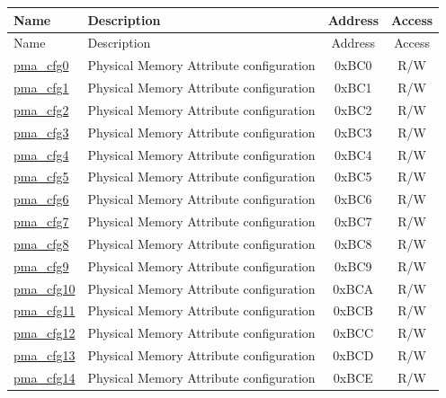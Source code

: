 \begin{longtable}{ | p{4.0cm} | p{8.4cm} | c | c| }
\hline\rowcolor{lightgray}
Name & Description & Address & Access \\ \hline
\endfirsthead
\hline
\rowcolor{lightgray}
Name & Description & Address & Access  \\
\hline
\endhead
\endfoot

\hyperref[sec:riscvcpu-pma-reg-desc]{pma\_cfg0} & Physical Memory Attribute configuration & 0xBC0 & R/W \\\hline
\hyperref[sec:riscvcpu-pma-reg-desc]{pma\_cfg1} & Physical Memory Attribute configuration & 0xBC1 & R/W \\\hline
\hyperref[sec:riscvcpu-pma-reg-desc]{pma\_cfg2} & Physical Memory Attribute configuration & 0xBC2 & R/W \\\hline
\hyperref[sec:riscvcpu-pma-reg-desc]{pma\_cfg3} & Physical Memory Attribute configuration & 0xBC3 & R/W \\\hline
\hyperref[sec:riscvcpu-pma-reg-desc]{pma\_cfg4} & Physical Memory Attribute configuration & 0xBC4 & R/W \\\hline
\hyperref[sec:riscvcpu-pma-reg-desc]{pma\_cfg5} & Physical Memory Attribute configuration & 0xBC5 & R/W \\\hline
\hyperref[sec:riscvcpu-pma-reg-desc]{pma\_cfg6} & Physical Memory Attribute configuration & 0xBC6 & R/W \\\hline
\hyperref[sec:riscvcpu-pma-reg-desc]{pma\_cfg7} & Physical Memory Attribute configuration & 0xBC7 & R/W \\\hline
\hyperref[sec:riscvcpu-pma-reg-desc]{pma\_cfg8} & Physical Memory Attribute configuration & 0xBC8 & R/W \\\hline
\hyperref[sec:riscvcpu-pma-reg-desc]{pma\_cfg9} & Physical Memory Attribute configuration & 0xBC9 & R/W \\\hline
\hyperref[sec:riscvcpu-pma-reg-desc]{pma\_cfg10} & Physical Memory Attribute configuration & 0xBCA & R/W \\\hline
\hyperref[sec:riscvcpu-pma-reg-desc]{pma\_cfg11} & Physical Memory Attribute configuration & 0xBCB & R/W \\\hline
\hyperref[sec:riscvcpu-pma-reg-desc]{pma\_cfg12} & Physical Memory Attribute configuration & 0xBCC & R/W \\\hline
\hyperref[sec:riscvcpu-pma-reg-desc]{pma\_cfg13} & Physical Memory Attribute configuration & 0xBCD & R/W \\\hline
\hyperref[sec:riscvcpu-pma-reg-desc]{pma\_cfg14} & Physical Memory Attribute configuration & 0xBCE & R/W \\\hline

\end{longtable}
